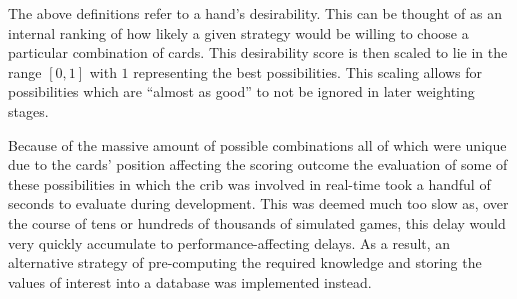 %
The above definitions refer to a hand's desirability.
%
This can be thought of as an internal ranking of how likely a given strategy
would be willing to choose a particular combination of cards.
%
This desirability score is then scaled to lie in the range $[0, 1]$ with
$1$ representing the best possibilities.
%
This scaling allows for possibilities which are ``almost as good'' to not be
ignored in later weighting stages.


Because of the massive amount of possible combinations%
\textemdash all of which were unique due to the cards' position affecting the
scoring outcome\textemdash%
the evaluation of some of these possibilities in which the crib was involved
in real-time took a handful of seconds to evaluate during development.
%
This was deemed much too slow as,
over the course of tens or hundreds of thousands of simulated games,
this delay would very quickly accumulate to performance-affecting delays.
%
As a result, an alternative strategy of pre-computing the required knowledge and
storing the values of interest into a database was implemented instead.


